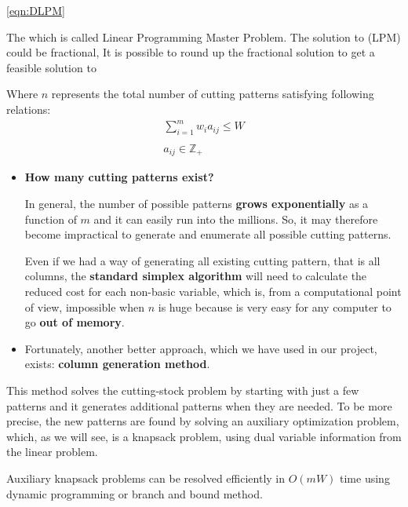 \documentclass[10pt,a4paper]{article}
\begin{document}
\ref{eqn:DLPM}


The 
which is called Linear Programming Master Problem. The solution to (LPM) could be fractional, It is possible to round up the fractional solution to get a feasible solution to 

\vspace{5mm}
Where $n$ represents the total number of cutting patterns satisfying following relations:
\begin{equation}
\begin{array} {c} 
\displaystyle\sum_{i=1}^m w_i a_{ij} \leq W \\\\ a_{ij} \in \mathbb{Z}_{+}
\end{array}
\end{equation}


\begin{itemize}
\item \textbf{How many cutting patterns exist?}

\vspace{5mm}
In general, the number of possible patterns \textbf{grows exponentially} as a function of $m$ and it can easily run into the millions. So, it may therefore become impractical to generate and enumerate all possible cutting patterns. 

\vspace{5mm}
Even if we had a way of generating all existing cutting pattern, that is all columns, the \textbf{standard simplex algorithm} will need to calculate the reduced cost for each non-basic variable, which is, from a computational point of view, impossible when $n$ is huge because is very easy for any computer to go \textbf{out of memory}.
\end{itemize}


\begin{itemize}
\item Fortunately, another better approach, which we have used in our project, exists: \textbf{column generation method}.
\end{itemize}

This method solves the cutting-stock problem by starting with just a few patterns and it generates additional patterns when they are needed. To be more precise, the new patterns are found by solving an auxiliary optimization problem, which, as we will see, is a knapsack problem, using dual variable information from the linear problem. 

Auxiliary knapsack problems can be resolved efficiently in $O(mW)$ time using dynamic programming or branch and bound method.
\end{document}

